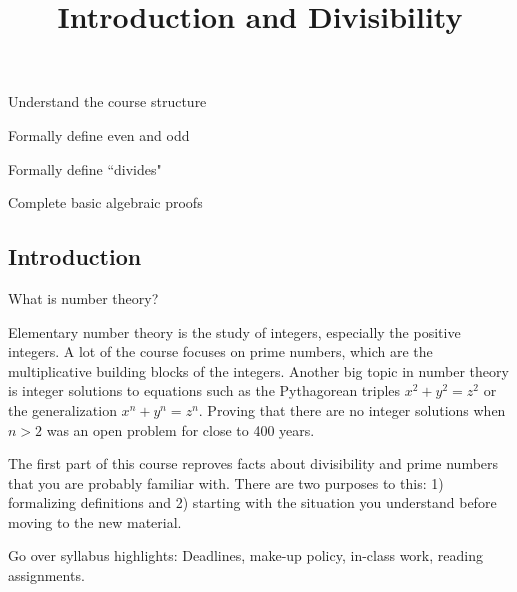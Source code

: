 \documentclass{../ximera}
\title{Introduction and Divisibility}
\begin{document}
\begin{abstract}
\end{abstract}
\maketitle


\begin{obj}
  \item Understand the course structure
  \item Formally define even and odd
  \item Formally define ``divides"
  \item Complete basic algebraic proofs
\end{obj}

\subsection{Introduction }%

What is number theory?

Elementary number theory is the study of integers, especially the positive integers. A lot of the course focuses on prime numbers, which are the multiplicative building blocks of the integers. Another big topic in number theory is integer solutions to equations such as the Pythagorean triples $x^2+y^2=z^2$ or the generalization $x^n+y^n=z^n$. Proving that there are no integer solutions when $n>2$ was an open problem for close to 400 years.

The first part of this course reproves facts about divisibility and prime numbers that you are probably familiar with. There are two purposes to this: 1) formalizing definitions and 2) starting with the situation you understand before moving to the new material.


\begin{instructorNotes}
  Go over syllabus highlights: Deadlines, make-up policy, in-class work, reading assignments.
\end{instructorNotes}


\end{document}
